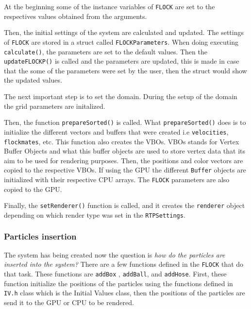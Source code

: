 At the beginning some of the instance variables of \texttt{FLOCK} are set to the respectives values obtained from the arguments. 

Then, the initial settings of the system are calculated and updated. The settings of \texttt{FLOCK} are stored in a struct called \texttt{FLOCKParameters}. When doing executing \texttt{calculate()}, the parameters are set to the default values. Then the \texttt{updateFLOCKP()} is called and the parameters are updated, this is made in case that the some of the parameters were set by the user, then the struct would show the updated values. 

The next important step is to set the domain. During the setup of the domain the grid parameters are initalized.

Then, the function \texttt{prepareSorted()} is called. What \texttt{prepareSorted()} does is to initialize the different vectors and buffers that were created i.e \texttt{velocities}, \texttt{flockmates}, etc. This function also creates the VBOs. VBOs stands for Vertex Buffer Objects and what this buffer objects are used to store vertex data that its aim to be used for rendering purposes\cite{vbo}. Then, the positions and color vectors are copied to the respective VBOs. If using the GPU the different \texttt{Buffer} objects are initialized with their respective CPU arrays. The \texttt{FLOCK} parameters are also copied to the GPU. 

Finally, the \texttt{setRenderer()} function is called, and it creates the \texttt{renderer} object depending on which render type was set in the \texttt{RTPSettings}.


\subsubsection{Particles insertion}
The system has being created now the question is \textit{how do the particles are inserted into the system?} There are a few functions defined in the \texttt{FLOCK} that do that task. These functions are \texttt{addBox} , \texttt{addBall}, and \texttt{addHose}. First, these function initialize the positions of the particles using the functions defined in \texttt{IV.h} class which is the Initial Values class, then the positions of the particles are send it to the GPU or CPU to be rendered. 

